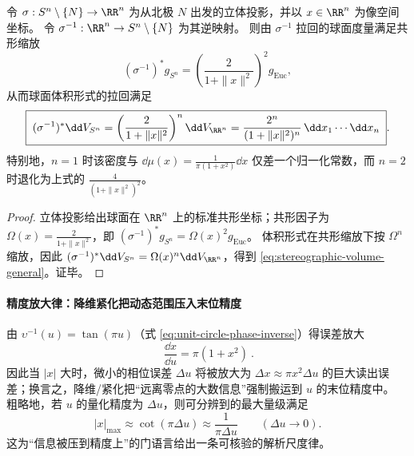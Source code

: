 \begin{proposition}\label{prop:stereographic-volume-form}
令 \(\sigma:S^{n}\setminus\{N\}\to\RR^{n}\) 为从北极 \(N\) 出发的立体投影，并以 \(x\in\RR^{n}\) 为像空间坐标。
令 \(\sigma^{-1}:\RR^{n}\to S^{n}\setminus\{N\}\) 为其逆映射。
则由 \(\sigma^{-1}\) 拉回的球面度量满足共形缩放
\[
(\sigma^{-1})^{\ast}g_{S^{n}}=\left(\frac{2}{1+\|x\|^{2}}\right)^{2}g_{\mathrm{Euc}},
\]
从而球面体积形式的拉回满足
\begin{equation}\label{eq:stereographic-volume-general}
\boxed{\;
(\sigma^{-1})^{\ast}\dd V_{S^{n}}
 =\left(\frac{2}{1+\|x\|^{2}}\right)^{n}\dd V_{\RR^{n}}
=\frac{2^{n}}{(1+\|x\|^{2})^{n}}\,\dd x_{1}\cdots \dd x_{n}\; }.
\end{equation}
特别地，\(n=1\) 时该密度与 \(\dd\mu(x)=\frac{1}{\pi(1+x^{2})}\dd x\) 仅差一个归一化常数，而 \(n=2\) 时退化为上式的 \(\frac{4}{(1+\|x\|^{2})^{2}}\)。
\end{proposition}
\begin{proof}
立体投影给出球面在 \(\RR^{n}\) 上的标准共形坐标；共形因子为 \(\Omega(x)=\frac{2}{1+\|x\|^{2}}\)，即 \((\sigma^{-1})^{\ast}g_{S^{n}}=\Omega(x)^{2}g_{\mathrm{Euc}}\)。
体积形式在共形缩放下按 \(\Omega^{n}\) 缩放，因此
\(
(\sigma^{-1})^{\ast}\dd V_{S^{n}}=\Omega(x)^{n}\dd V_{\RR^{n}}
\)，得到 \eqref{eq:stereographic-volume-general}。证毕。
\end{proof}

\paragraph{精度放大律：降维紧化把动态范围压入末位精度}
由 \(\upsilon^{-1}(u)=\tan(\pi u)\)（式 \eqref{eq:unit-circle-phase-inverse}）得误差放大
\begin{equation}\label{eq:app-precision-amplification}
\boxed{\ \frac{\dd x}{\dd u}=\pi(1+x^2)\ }.
\end{equation}
因此当 \(|x|\) 大时，微小的相位误差 \(\Delta u\) 将被放大为 \(\Delta x\approx \pi x^2\Delta u\) 的巨大读出误差；换言之，降维/紧化把“远离零点的大数信息”强制搬运到 \(u\) 的末位精度中。
粗略地，若 \(u\) 的量化精度为 \(\Delta u\)，则可分辨到的最大量级满足
\[
|x|_{\max}\approx \cot(\pi\Delta u)\approx \frac{1}{\pi\Delta u}\qquad(\Delta u\to 0).
\]
这为“信息被压到精度上”的门语言给出一条可核验的解析尺度律。
